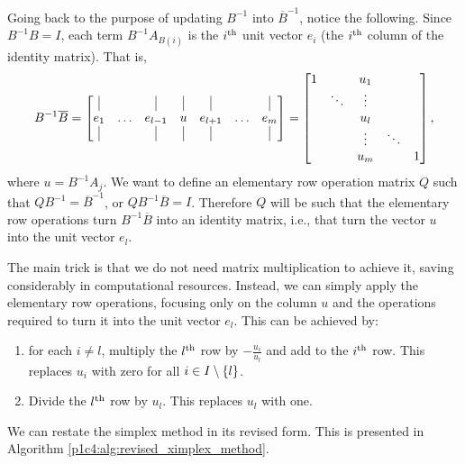 Going back to the purpose of updating $B^{-1}$ into $\overline{B}^{-1}$,  notice the following. Since $B^{-1}B = I$, each term $B^{-1}A_{B(i)}$ is the $i^\text{th}$ unit vector $e_i$ (the $i^\text{th}$ column of the identity matrix). That is, 
%
\begin{equation*}
	B^{-1}\overline{B} = \begin{bmatrix} \vline & & \vline & \vline & \vline & & \vline \\
		e_1 & \dots & e_{l-1} & u & e_{l+1} & \dots & e_m \\
		 \vline & & \vline & \vline & \vline & & \vline								
	\end{bmatrix} = \begin{bmatrix} 1 & & u_1 & & \\ & \ddots & \vdots &  & \\ & & u_l & & \\ & & \vdots & \ddots & \\
	& & u_m & & 1 
	 	\end{bmatrix},
\end{equation*}
%
where $u = B^{-1}A_j$. We want to define an elementary row operation matrix $Q$ such that $QB^{-1} = \overline{B}^{-1}$, or $QB^{-1}\overline{B} = I$. Therefore $Q$ will be such that the elementary row operations turn $B^{-1}\overline{B}$ into an identity matrix, i.e., that turn the vector $u$ into the unit vector $e_l$.

The main trick is that we do not need matrix multiplication to achieve it, saving considerably in computational resources. Instead, we can simply apply the elementary row operations, focusing only on the column $u$ and the operations required to turn it into the unit vector $e_l$. This can be achieved by:

\begin{enumerate}
	\item for each $i \neq l$, multiply the $l^\text{th}$ row by $-\frac{u_i}{u_l}$ and add to the $i^\text{th}$ row. This replaces $u_i$ with zero for all $i \in I \setminus \left\{ l \right \}$.
	\item Divide the $l^\text{th}$ row by $u_l$. This replaces $u_l$ with one.
\end{enumerate}

We can restate the simplex method in its revised form. This is presented in Algorithm \ref{p1c4:alg:revised_ximplex_method}.

